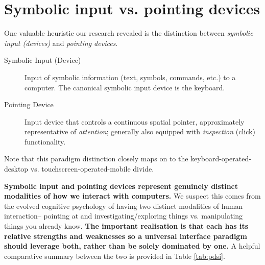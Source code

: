 \documentclass[logo,bsc,singlespacing,parskip]{infthesis}
\begin{document}
\section{Symbolic input vs. pointing devices}
\label{sec:org0736070}
One valuable heuristic our research revealed is the distinction between \emph{symbolic input (devices)} and \emph{pointing devices}.

\begin{mdframed}
\begin{description}
\item[{Symbolic Input (Device)\label{symbolic input}}] Input of symbolic information (text, symbols, commands, etc.) to a computer.
The canonical symbolic input device is the keyboard.
\end{description}
\end{mdframed}

\begin{mdframed}
\begin{description}
\item[{Pointing Device\label{pointing device}}] Input device that controls a continuous spatial pointer, approximately representative of \emph{attention}; generally also equipped with \emph{inspection} (click) functionality.
\end{description}
\end{mdframed}

Note that this paradigm distinction closely maps on to the keyboard-operated-desktop vs. touchscreen-operated-mobile divide.

\textbf{Symbolic input and pointing devices represent genuinely distinct modalities of how we interact with computers.}
We suspect this comes from the evolved cognitive psychology of having two distinct modalities of human interaction-- pointing at and investigating/exploring things vs. manipulating things you already know.
\textbf{The important realisation is that each has its relative strengths and weaknesses so a universal interface paradigm should leverage both, rather than be solely dominated by one.}
A helpful comparative summary between the two is provided in Table \ref{tab:pdsi}.
\end{document}
